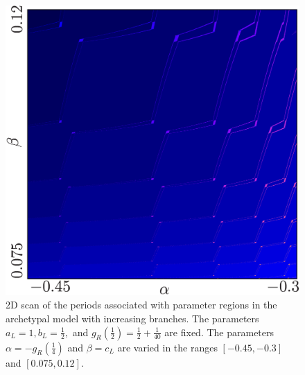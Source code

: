 \begin{figure}
	\centering
	\includegraphics[width=.6 \textwidth]{../Figures/7/7.1/result.png}
	\caption[2D scan of the periods associated with parameter regions in the archetypal model with increasing branches]{
		2D scan of the periods associated with parameter regions in the archetypal model with increasing branches.
		The parameters $a_L = 1, b_L = \frac{1}{2},$ and $g_R\left(\frac{1}{2}\right) = \frac{1}{2} + \frac{1}{40}$ are fixed.
		The parameters $\alpha = -g_R\left(\frac{1}{4}\right)$ and $\beta = c_L$ are varied in the ranges $[-0.45, -0.3]$ and $[0.075, 0.12]$.
	}
	\label{fig:add.arch.new.period}
\end{figure}

